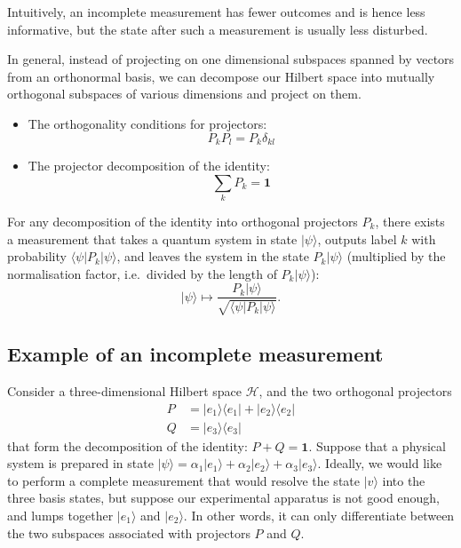\documentclass[fleqn]{article}
\providecommand{\tightlist}{%
  \setlength{\itemsep}{0pt}\setlength{\parskip}{0pt}}
\newenvironment{idea}{\noindent}{\medskip}
\begin{document}
\begin{idea}

Intuitively, an incomplete measurement has fewer outcomes and is hence less informative, but the state after such a measurement is usually less disturbed.

\end{idea}

In general, instead of projecting on one dimensional subspaces spanned by vectors from an orthonormal basis, we can decompose our Hilbert space into mutually orthogonal subspaces of various dimensions and project on them.

\begin{idea}

\begin{itemize}
\tightlist
\item
  The orthogonality conditions for projectors:
  \[
      P_k P_l = P_k\delta_{kl}
    \]
\item
  The projector decomposition of the identity:
  \[
      \sum_k P_k = \mathbf{1}
    \]
\end{itemize}

\end{idea}

For any decomposition of the identity into orthogonal projectors \(P_k\), there exists a measurement that takes a quantum system in state \(|\psi\rangle\), outputs label \(k\) with probability \(\langle\psi|P_k|\psi\rangle\), and leaves the system in the state \(P_k|\psi\rangle\) (multiplied by the normalisation factor, i.e.~divided by the length of \(P_k|\psi\rangle\)):
\[
  |\psi\rangle
  \mapsto
  \frac{P_k|\psi\rangle}{\sqrt{\langle\psi|P_k|\psi\rangle}}.
\]

\hypertarget{example-of-an-incomplete-measurement}{%
\subsection{Example of an incomplete measurement}\label{example-of-an-incomplete-measurement}}

Consider a three-dimensional Hilbert space \(\mathcal{H}\), and the two orthogonal projectors
\[
  \begin{aligned}
    P &= |e_1\rangle\langle e_1| + |e_2\rangle\langle e_2|
  \\Q &= |e_3\rangle\langle e_3|
  \end{aligned}
\]
that form the decomposition of the identity: \(P+Q=\mathbf{1}\).
Suppose that a physical system is prepared in state \(|\psi\rangle = \alpha_1|e_1\rangle + \alpha_2|e_2\rangle + \alpha_3|e_3\rangle\).
Ideally, we would like to perform a complete measurement that would resolve the state \(|v\rangle\) into the three basis states, but suppose our experimental apparatus is not good enough, and lumps together \(|e_1\rangle\) and \(|e_2\rangle\).
In other words, it can only differentiate between the two subspaces associated with projectors \(P\) and \(Q\).
\end{document}
